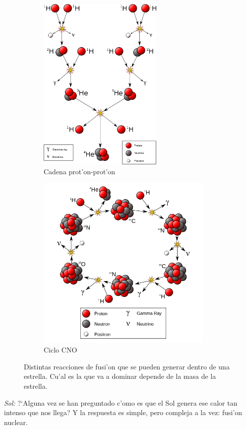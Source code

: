 \documentclass{article}
\begin{document}
\begin{enumerate}[a)]
\begin{figure}
\centering
  \begin{subfigure}{6cm}
    \centering\includegraphics[width=6cm]{p-p.png}
    \caption{Cadena prot'on-prot'on}
  \end{subfigure}
  \begin{subfigure}{6cm}
    \centering\includegraphics[width=8.5cm]{cno.png}
    \caption{Ciclo CNO}
  \end{subfigure}
  \caption{Distintas reacciones de fusi'on que se pueden generar dentro de una estrella. Cu'al es la que va a dominar depende de la masa de la estrella.}
\end{figure} 
\vspace{3mm}



\vspace{2mm}
\emph{Sol:}
\vspace{2mm}
?`Alguna vez se han preguntado c'omo es que el Sol genera ese calor tan intenso que nos llega? Y la respuesta es simple, pero compleja a la vez: fusi'on nuclear.


\end{enumerate}
\end{document}
